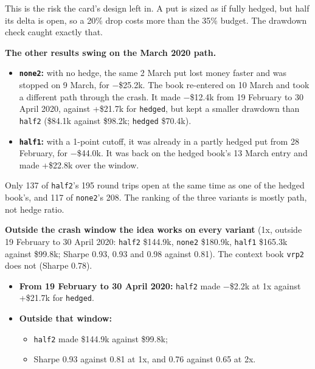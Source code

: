 \documentclass{article}
\begin{document}
This is the risk the card's design left in. A put is sized as if fully hedged, but half its delta is open, so a 20\% drop costs more than the 35\% budget. The drawdown check caught exactly that.

\textbf{The other results swing on the March 2020 path.}

\begin{itemize}

\item \textbf{\texttt{none2}:} with no hedge, the same 2 March put lost money faster and was stopped on 9 March, for \ensuremath{-}\$25.2k. The book re-entered on 10 March and took a different path through the crash. It made \ensuremath{-}\$12.4k from 19 February to 30 April 2020, against +\$21.7k for \texttt{hedged}, but kept a smaller drawdown than \texttt{half2} (\$84.1k against \$98.2k; \texttt{hedged} \$70.4k).

\item \textbf{\texttt{half1}:} with a 1-point cutoff, it was already in a partly hedged put from 28 February, for \ensuremath{-}\$44.0k. It was back on the hedged book's 13 March entry and made +\$22.8k over the window.

\end{itemize}

Only 137 of \texttt{half2}'s 195 round trips open at the same time as one of the hedged book's, and 117 of \texttt{none2}'s 208. The ranking of the three variants is mostly path, not hedge ratio.

\textbf{Outside the crash window the idea works on every variant} (1x, outside 19 February to 30 April 2020: \texttt{half2} \$144.9k, \texttt{none2} \$180.9k, \texttt{half1} \$165.3k against \$99.8k; Sharpe 0.93, 0.93 and 0.98 against 0.81). The context book \texttt{vrp2} does not (Sharpe 0.78).

\begin{itemize}

\item \textbf{From 19 February to 30 April 2020:} \texttt{half2} made \ensuremath{-}\$2.2k at 1x against +\$21.7k for \texttt{hedged}.

\item \textbf{Outside that window:}

\begin{itemize}

\item \texttt{half2} made \$144.9k against \$99.8k;

\item Sharpe 0.93 against 0.81 at 1x, and 0.76 against 0.65 at 2x.

\end{itemize}

\end{itemize}
\end{document}
